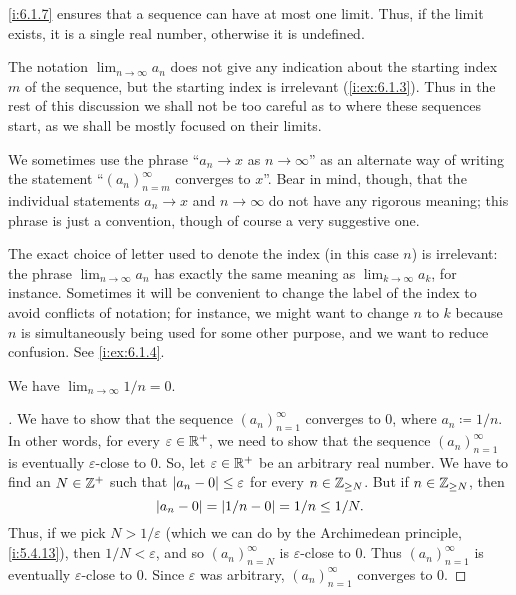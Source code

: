 \begin{note}
  \cref{i:6.1.7} ensures that a sequence can have at most one limit.
  Thus, if the limit exists, it is a single real number, otherwise it is undefined.
\end{note}

\begin{rmk}\label{i:6.1.9}
  The notation \(\lim_{n \to \infty} a_n\) does not give any indication about the starting index \(m\) of the sequence, but the starting index is irrelevant (\cref{i:ex:6.1.3}).
  Thus in the rest of this discussion we shall not be too careful as to where these sequences start, as we shall be mostly focused on their limits.
\end{rmk}

\begin{note}
  We sometimes use the phrase ``\(a_n \to x\) as \(n \to \infty\)'' as an alternate way of writing the statement ``\((a_n)_{n = m}^\infty\) converges to \(x\)''.
  Bear in mind, though, that the individual statements \(a_n \to x\) and \(n \to \infty\) do not have any rigorous meaning;
  this phrase is just a convention, though of course a very suggestive one.
\end{note}

\begin{rmk}\label{i:6.1.10}
  The exact choice of letter used to denote the index (in this case \(n\)) is irrelevant:
  the phrase \(\lim_{n \to \infty} a_n\) has exactly the same meaning as \(\lim_{k \to \infty} a_k\), for instance.
  Sometimes it will be convenient to change the label of the index to avoid conflicts of notation;
  for instance, we might want to change \(n\) to \(k\) because \(n\) is simultaneously being used for some other purpose, and we want to reduce confusion.
  See \cref{i:ex:6.1.4}.
\end{rmk}

\begin{prop}\label{i:6.1.11}
  We have \(\lim_{n \to \infty} 1 / n = 0\).
\end{prop}

\begin{proof}[]
  We have to show that the sequence \((a_n)_{n = 1}^\infty\) converges to \(0\), where \(a_n \coloneqq 1 / n\).
  In other words, for every \(\varepsilon \in \mathbb{R}^+\), we need to show that the sequence \((a_n)_{n = 1}^\infty\) is eventually \(\varepsilon\)-close to \(0\).
  So, let \(\varepsilon \in \mathbb{R}^+\) be an arbitrary real number.
  We have to find an \(N \in \mathbb{Z}^+\) such that \(\left\lvert a_n - 0\right\rvert \leq \varepsilon\) for every \(n \in \mathbb{Z}_{\geq N}\).
  But if \(n \in \mathbb{Z}_{\geq N}\), then
  \[
    \left\lvert a_n - 0\right\rvert = \left\lvert1 / n - 0\right\rvert = 1 / n \leq 1 / N.
  \]
  Thus, if we pick \(N > 1 / \varepsilon\) (which we can do by the Archimedean principle, \cref{i:5.4.13}), then \(1 / N < \varepsilon\), and so \((a_n)_{n = N}^\infty\) is \(\varepsilon\)-close to \(0\).
  Thus \((a_n)_{n = 1}^\infty\) is eventually \(\varepsilon\)-close to \(0\).
  Since \(\varepsilon\) was arbitrary, \((a_n)_{n = 1}^\infty\) converges to \(0\).
\end{proof}

